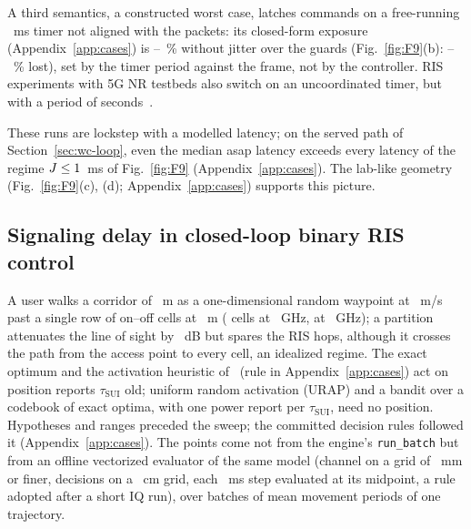A third semantics, a constructed worst case, latches commands on a free-running
\numEbTickMs~ms timer not aligned with the packets: its closed-form exposure
(Appendix~\ref{app:cases}) is \numEbCfTickZeroMinPct--\numEbCfTickZeroMaxPct~\% without jitter
over the guards (Fig.~\ref{fig:F9}(b): \numEbArcTickPerMinPct--\numEbArcTickPerMaxPct~\% lost),
set by the timer period against the frame, not by the controller. RIS experiments with 5G NR
testbeds also switch on an uncoordinated timer, but with a period of
seconds~\cite{Yashvanth2026Random,Kiran2026Random}.

These runs are lockstep with a modelled latency; on the served path of
Section~\ref{sec:wc-loop}, even the median asap latency exceeds every latency of the regime
$J\le1$~ms of Fig.~\ref{fig:F9} (Appendix~\ref{app:cases}).
The lab-like geometry (Fig.~\ref{fig:F9}(c), (d); Appendix~\ref{app:cases})
supports this picture.

\subsection{Signaling delay in closed-loop binary RIS control}\label{sec:cases-ea}
A user walks a corridor of \numEaLengthM~m as a one-dimensional random
waypoint at \numEaSpeed~m/s past a single row of on--off cells at \numEaHeightM~m
(\numEaCellsOne{} cells at \numEaFcOneGHz~GHz, \numEaCellsTwo{} at \numEaFcTwoGHz~GHz); a
partition attenuates the line of sight by \numEaLossDb~dB but spares the RIS hops, although it
crosses the path from the access point to every cell, an idealized regime. The exact optimum
and the activation heuristic of~\cite{Mishra2025WCL} (rule in Appendix~\ref{app:cases}) act on
position reports $\tau_{\mathrm{SUI}}$ old; uniform random activation (URAP) and a bandit over
a codebook of exact optima, with one power report per $\tau_{\mathrm{SUI}}$, need no position.
Hypotheses and ranges preceded the sweep; the committed decision rules followed it
(Appendix~\ref{app:cases}). The points come not from the
engine's \texttt{run\_batch} but from an offline vectorized evaluator of the same model (channel
on a grid of \numEaFineGridMm~mm or finer, decisions on a \numEaCoarseGridCm~cm grid, each
\numEaStepMs~ms step evaluated at its midpoint, a rule adopted after a short IQ run), over
\numEaBatches{} batches of \numEaPeriods{} mean movement periods of one trajectory.

